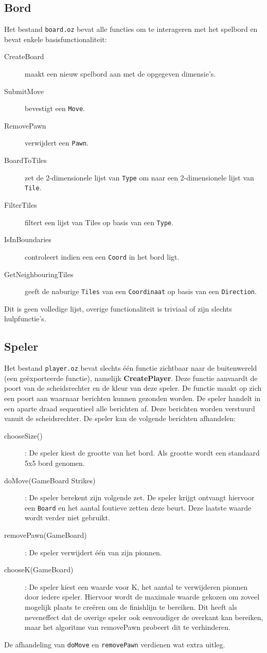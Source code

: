 \documentclass{article}
\begin{document}
\subsection{Bord}
Het bestand \texttt{board.oz} bevat alle functies om te interageren met het spelbord en bevat enkele basisfunctionaliteit: 
\begin{description}
	\item[CreateBoard] maakt een nieuw spelbord aan met de opgegeven dimensie's. 
	\item[SubmitMove] bevestigt een \texttt{Move}.
	\item[RemovePawn] verwijdert een \texttt{Pawn}.
	\item[BoardToTiles] zet de 2-dimensionele lijst van \texttt{Type} om naar een 2-dimensionele lijst van \texttt{Tile}.
	\item[FilterTiles] filtert een lijst van Tiles op basis van een \texttt{Type}.
	\item[IsInBoundaries] controleert indien een een \texttt{Coord} in het bord ligt. 
	\item[GetNeighbouringTiles] geeft de naburige \texttt{Tiles} van een \texttt{Coordinaat} op basis van een \texttt{Direction}.
\end{description}
Dit is geen volledige lijst, overige functionaliteit is triviaal of zijn slechts hulpfunctie's.  


\subsection{Speler}
Het bestand \texttt{player.oz} bevat slechts één functie zichtbaar naar de buitenwereld (een geëxporteerde functie), namelijk \textbf{CreatePlayer}. Deze functie aanvaardt de poort van de scheidsrechter en de kleur van deze speler. De functie maakt op zich een poort aan waarnaar berichten kunnen gezonden worden. De speler handelt in een aparte draad sequentieel alle berichten af. Deze berichten worden verstuurd vanuit de scheidsrechter. De speler kan de volgende berichten afhandelen:
\begin{description}
	\item[chooseSize()]: De speler kiest de grootte van het bord. Als grootte wordt een standaard 5x5 bord genomen. 
	\item[doMove(GameBoard Strikes)]: De speler berekent zijn volgende zet. De speler krijgt ontvangt hiervoor een \texttt{Board} en het aantal foutieve zetten deze beurt. Deze laatste waarde wordt verder niet gebruikt. 
	\item[removePawn(GameBoard)]: De speler verwijdert één van zijn pionnen. 
	\item[chooseK(GameBoard)]: De speler kiest een waarde voor K, het aantal te verwijderen pionnen door iedere speler. Hiervoor wordt de maximale waarde gekozen om zoveel mogelijk plaats te creëren om de finishlijn te bereiken. Dit heeft als neveneffect dat de overige speler ook eenvoudiger de overkant kan bereiken, maar het algoritme van removePawn probeert dit te verhinderen. 
\end{description}
De afhandeling van \texttt{doMove} en \texttt{removePawn} verdienen wat extra uitleg. 
\end{document}
